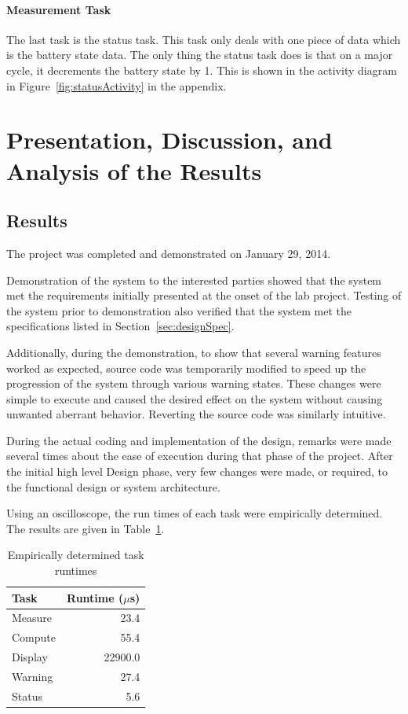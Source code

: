 \documentclass[12pt]{article} %
\begin{document}
\paragraph{Measurement Task}
The last task is the status task. This task only deals with one piece of data
which is the battery state data. The only thing the status task does is that on
a major cycle, it decrements the battery state by 1. This is shown in the
activity diagram in Figure~\ref{fig:statusActivity} in the appendix.

\section{Presentation, Discussion, and Analysis of the Results}

\subsection{Results}
The project was completed and demonstrated on January 29, 2014.

Demonstration of the system to the interested parties showed that the system met the requirements initially presented at the onset of the lab project.
Testing of the system prior to demonstration also verified that the system met the specifications listed in Section~\ref{sec:designSpec}.

Additionally, during the demonstration, to show that several warning features worked as expected, source code was temporarily modified to speed up the progression of the system through various warning states. These changes were simple to execute and caused the desired effect on the system without causing unwanted aberrant behavior. Reverting the source code was similarly intuitive.

During the actual coding and implementation of the design, remarks were made several times about the ease of execution during that phase of the project. After the initial high level Design phase, very few changes were made, or required, to the functional design or system architecture.

Using an oscilloscope, the run times of each task were empirically determined. The results are given in Table~\ref{tab:taskRuntimes}.

\begin{table}[h]
	\centering
	\begin{tabular}{|l|r|} 
		\hline
		Task & Runtime ($\mu$s) \\ \hline
		Measure & 23.4 \\ \hline
		Compute & 55.4 \\ \hline
		Display & 22900.0 \\ \hline
		Warning & 27.4	\\ \hline
		Status & 5.6	\\ \hline
	\end{tabular}
	\caption{Empirically determined task runtimes}
  \label{tab:taskRuntimes}
\end{table}
\end{document}
